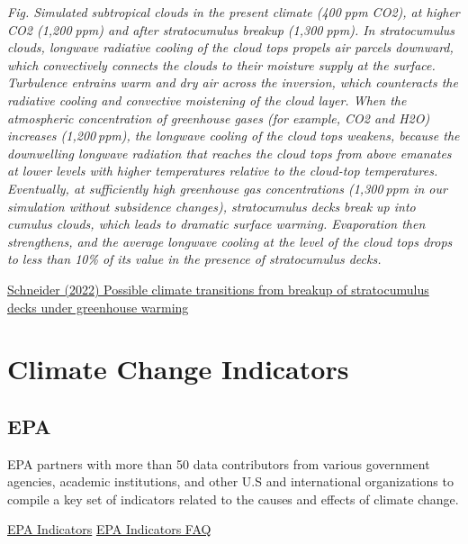 \documentclass[
]{book}
\begin{document}
\emph{Fig. Simulated subtropical clouds in the present climate (400ppm CO2), at higher CO2 (1,200ppm) and after stratocumulus breakup (1,300ppm). In stratocumulus clouds, longwave radiative cooling of the cloud tops propels air parcels downward, which convectively connects the clouds to their moisture supply at the surface. Turbulence entrains warm and dry air across the inversion, which counteracts the radiative cooling and convective moistening of the cloud layer. When the atmospheric concentration of greenhouse gases (for example, CO2 and H2O) increases (1,200 ppm), the longwave cooling of the cloud tops weakens, because the downwelling longwave radiation that reaches the cloud tops from above emanates at lower levels with higher temperatures relative to the cloud-top temperatures. Eventually, at sufficiently high greenhouse gas concentrations (1,300 ppm in our simulation without subsidence changes), stratocumulus decks break up into cumulus clouds, which leads to dramatic surface warming. Evaporation then strengthens, and the average longwave cooling at the level of the cloud tops drops to less than 10\% of its value in the presence of stratocumulus decks.}

\href{https://www.nature.com/articles/s41561-019-0310-1.epdf?author_access_token=0KiqRkFsS6qEi37dkGz8X9RgN0jAjWel9jnR3ZoTv0Nq8LfnDsfOJgJee7VyE1P3etD8357qMjqyq2BVVSP5V9bFmsDkWYfYyGV7gtmSgJncc5u_hUNNfMaYS7BFcu8_tWNipaYj6kz2PMZ8OXu5CQ\%3D\%3D}{Schneider (2022) Possible climate transitions from breakup of stratocumulus decks under greenhouse warming}

\hypertarget{climate-change-indicators}{%
\chapter{Climate Change Indicators}\label{climate-change-indicators}}

\hypertarget{epa}{%
\section{EPA}\label{epa}}

EPA partners with more than 50 data contributors from various government agencies, academic institutions, and other U.S and international organizations to compile a key set of indicators related to the causes and effects of climate change.

\href{https://www.epa.gov/climate-indicators}{EPA Indicators}
\href{https://www.epa.gov/climate-indicators/frequent-questions-about-climate-change-indicators}{EPA Indicators FAQ}
\end{document}

